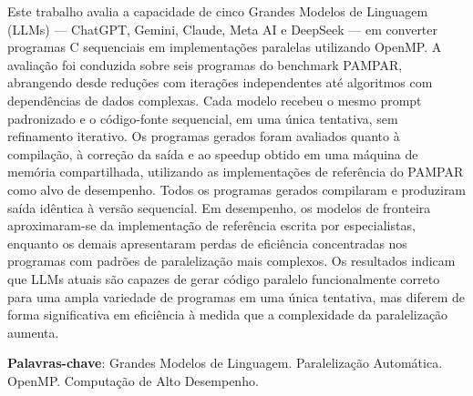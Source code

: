 \begin{resumo}
Este trabalho avalia a capacidade de cinco Grandes Modelos de Linguagem (LLMs) — ChatGPT, Gemini, Claude, Meta AI e DeepSeek — em converter programas C sequenciais em implementações paralelas utilizando OpenMP. 
A avaliação foi conduzida sobre seis programas do benchmark PAMPAR, abrangendo desde reduções com iterações independentes até algoritmos com dependências de dados complexas. 
Cada modelo recebeu o mesmo prompt padronizado e o código-fonte sequencial, em uma única tentativa, sem refinamento iterativo. 
Os programas gerados foram avaliados quanto à compilação, à correção da saída e ao speedup obtido em uma máquina de memória compartilhada, utilizando as implementações de referência do PAMPAR como alvo de desempenho. 
Todos os programas gerados compilaram e produziram saída idêntica à versão sequencial. 
Em desempenho, os modelos de fronteira aproximaram-se da implementação de referência escrita por especialistas, enquanto os demais apresentaram perdas de eficiência concentradas nos programas com padrões de paralelização mais complexos. 
Os resultados indicam que LLMs atuais são capazes de gerar código paralelo funcionalmente correto para uma ampla variedade de programas em uma única tentativa, mas diferem de forma significativa em eficiência à medida que a complexidade da paralelização aumenta.

\vspace{\onelineskip}

\noindent
\textbf{Palavras-chave}: Grandes Modelos de Linguagem. Paralelização Automática. OpenMP. Computação de Alto Desempenho.
\end{resumo}

